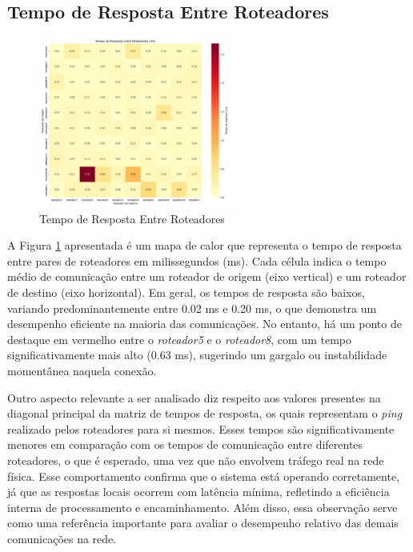 \documentclass[12pt,a4paper]{report}
\begin{document}
\subsection{Tempo de Resposta Entre Roteadores}
\begin{figure}[h!]
    \centering
    \includegraphics[width=0.6\textwidth]{matriz_tempos_resposta.png}
    \caption{Tempo de Resposta Entre Roteadores}
    \label{fig:matriz}
\end{figure}

A Figura \ref{fig:matriz} apresentada é um mapa de calor que representa o tempo de resposta entre pares de roteadores em milissegundos (ms). Cada célula indica o tempo médio de comunicação entre um roteador de origem (eixo vertical) e um roteador de destino (eixo horizontal). Em geral, os tempos de resposta são baixos, variando predominantemente entre 0.02 ms e 0.20 ms, o que demonstra um desempenho eficiente na maioria das comunicações. No entanto, há um ponto de destaque em vermelho entre o \textit{roteador5} e o \textit{roteador8}, com um tempo significativamente mais alto (0.63 ms), sugerindo um gargalo ou instabilidade momentânea naquela conexão.

Outro aspecto relevante a ser analisado diz respeito aos valores presentes na diagonal principal da matriz de tempos de resposta, os quais representam o \textit{ping} realizado pelos roteadores para si mesmos. Esses tempos são significativamente menores em comparação com os tempos de comunicação entre diferentes roteadores, o que é esperado, uma vez que não envolvem tráfego real na rede física. Esse comportamento confirma que o sistema está operando corretamente, já que as respostas locais ocorrem com latência mínima, refletindo a eficiência interna de processamento e encaminhamento. Além disso, essa observação serve como uma referência importante para avaliar o desempenho relativo das demais comunicações na rede.
\end{document}
